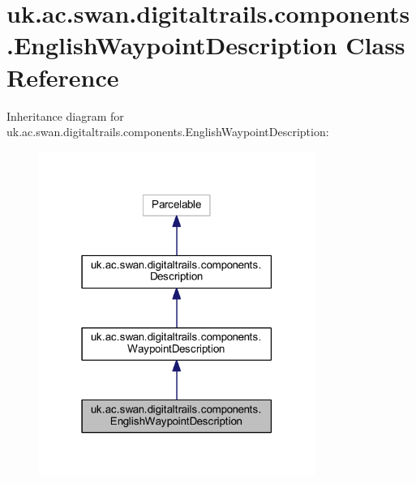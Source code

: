 \hypertarget{classuk_1_1ac_1_1swan_1_1digitaltrails_1_1components_1_1_english_waypoint_description}{\section{uk.\+ac.\+swan.\+digitaltrails.\+components.\+English\+Waypoint\+Description Class Reference}
\label{classuk_1_1ac_1_1swan_1_1digitaltrails_1_1components_1_1_english_waypoint_description}
}


Inheritance diagram for uk.\+ac.\+swan.\+digitaltrails.\+components.\+English\+Waypoint\+Description\+:\nopagebreak
\begin{figure}[H]
\begin{center}
\leavevmode
\includegraphics[width=255pt]{classuk_1_1ac_1_1swan_1_1digitaltrails_1_1components_1_1_english_waypoint_description__inherit__graph}
\end{center}
\end{figure}


